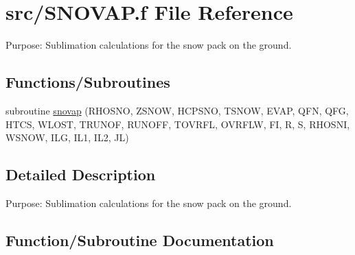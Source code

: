 \hypertarget{SNOVAP_8f}{}\section{src/\+S\+N\+O\+V\+A\+P.f File Reference}
\label{SNOVAP_8f}


Purpose\+: Sublimation calculations for the snow pack on the ground.  


\subsection*{Functions/\+Subroutines}
\begin{DoxyCompactItemize}
\item 
subroutine \hyperlink{SNOVAP_8f_a64f8b35d4ad3e8ced53867425e4500d3}{snovap} (R\+H\+O\+S\+N\+O, Z\+S\+N\+O\+W, H\+C\+P\+S\+N\+O, T\+S\+N\+O\+W, E\+V\+A\+P, Q\+F\+N, Q\+F\+G, H\+T\+C\+S, W\+L\+O\+S\+T, T\+R\+U\+N\+O\+F, R\+U\+N\+O\+F\+F, T\+O\+V\+R\+F\+L, O\+V\+R\+F\+L\+W, F\+I, R, S, R\+H\+O\+S\+N\+I, W\+S\+N\+O\+W, I\+L\+G, I\+L1, I\+L2, J\+L)
\end{DoxyCompactItemize}


\subsection{Detailed Description}
Purpose\+: Sublimation calculations for the snow pack on the ground. 



\subsection{Function/\+Subroutine Documentation}
\hypertarget{SNOVAP_8f_a64f8b35d4ad3e8ced53867425e4500d3}{}
